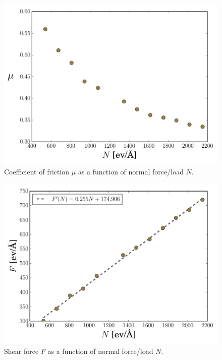 \documentclass[twoside,english]{uiofysmaster}
\begin{document}
\begin{figure}[H]
	\centering
	\includegraphics[width=0.7\linewidth]{figures/friction/scalingCoeffisient/UvsN}
	\caption{Coefficient of friction $\mu$ as a function of normal force/load $N$.}
	\label{fig:uvsn}
\end{figure}


\begin{figure}[H]
	\centering
	\includegraphics[width=0.7\linewidth]{figures/friction/scalingCoeffisient/FvsN}
	\caption{Shear force $F$ as a function of normal force/load $N$.}
	\label{fig:fvsn}
\end{figure}
\end{document}

